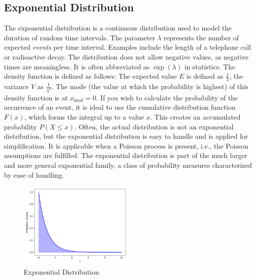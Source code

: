 \subsection{Exponential Distribution}\label{Exponential Distribution}
The exponential distribution is a continuous distribution used to model the duration of random time intervals. The parameter $\lambda$ represents the number of expected \textit{events} per time interval. Examples include the length of a telephone call or radioactive decay. The distribution does not allow negative values, as negative times are meaningless. It is often abbreviated as $\exp(\lambda)$ in statistics. The density function is defined as follows:
The expected value $E$ is defined as $\frac{1}{\lambda}$, the variance $V$ as $\frac{1}{\lambda^2}$. The mode (the value at which the probability is highest) of this density function is at $x_{\text{mod}}=0$. If you wish to calculate the probability of the occurrence of an event, it is ideal to use the cumulative distribution function $F(x)$, which forms the integral up to a value $x$. This creates an accumulated probability $P(X\leq x)$. Often, the actual distribution is not an exponential distribution, but the exponential distribution is easy to handle and is applied for simplification. It is applicable when a Poisson process is present, i.e., the Poisson assumptions are fulfilled. The exponential distribution is part of the much larger and more general exponential family, a class of probability measures characterized by ease of handling.

\begin{figure}[h]
    \centering
    \includegraphics[width=0.5\textwidth]{../images/plot_exponential_distribution.png}
    \caption{Exponential Distribution}
    \label{fig:exponential_distribution}
\end{figure}

